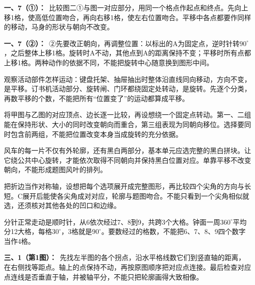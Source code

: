 \documentclass[multi=snippet,border=0pt]{standalone}
\newenvironment{snippet}[3]{\begin{minipage}{#1bp}\color{answerred}\fontsize{#2}{#3}\selectfont\raggedright}{\end{minipage}}
\begin{document}
\begin{snippet}{505}{11.5}{14}\textbf{一、7（①）：}\ 比较图二①与图一对应部分，用同一个格点作起点和终点。先向上移1格，使高低位置吻合，再向右移1格，使左右位置吻合。平移中各点都要作同样的移动，马身的形状与朝向不改变。\end{snippet}
\begin{snippet}{505}{11.5}{14}\textbf{一、7（②）：}\ ②先要改正朝向，再调整位置：以标出的A为固定点，逆时针转\(90^\circ\)，之后整体上移1格。旋转时A不动，其他点到A的距离保持不变；平移时所有点都上移1格。两种动作的依据不同，不能把旋转中心随意换到图形中间。\end{snippet}
\begin{snippet}{505}{11.5}{14}观察活动部件怎样运动：键盘托架、抽屉抽出时整体沿直线同向移动，方向不变，是平移。订书机活动部分、旋转闸、门环都绕固定处转动，是旋转。先逐个分类，再数平移的个数，不能把所有“位置变了”的运动都算成平移。\end{snippet}
\begin{snippet}{505}{11.5}{14}将甲图与乙图的对应顶点、边长逐一比较，再设想绕一个固定点转动。第一、二组能在保持形状、大小的同时改变朝向而重合，第三组表现为同朝向移位。选择要同时包含前两组，不能把位置改变本身当成旋转的充分依据。\end{snippet}
\begin{snippet}{505}{11.5}{14}风车的每一片不仅有外轮廓，还有黑白两部分，基本单元应选完整的黑白拼块。让它绕公共中心旋转，才能依次取得不同朝向并保持黑白位置对应。单靠平移不改变朝向，不能形成题图风叶的排列。\end{snippet}
\begin{snippet}{505}{11.5}{14}把折边当作对称轴，设想把每个选项展开成完整图形，再比较四个尖角的方向与长短。C展开后能使各尖角成对对应，轮廓与题图吻合。不能只看到一个尖角相似就选，还须核对其他各处的凹口和边缘。\end{snippet}
\begin{snippet}{505}{11.5}{14}分针正常走动是顺时针，从6依次经过7、8到9，共跨3个大格。钟面一周\(360^\circ\)平均分12大格，每格\(30^\circ\)，3格就是\(90^\circ\)。要数经过的格数，不能把6、7、8、9四个数字当作4格。\end{snippet}
\begin{snippet}{505}{11.5}{14}\textbf{三、1（第1图）：}\ 先找左半图的各个拐点，沿水平格线数它们到竖直轴的距离，在右侧找等距点。轴上的点保持不动，再按原图顺序把对应点连接。最后检查对应点连线是否垂直于轴，并被轴平分，不能只把轮廓画得大致相像。\end{snippet}
\end{document}
